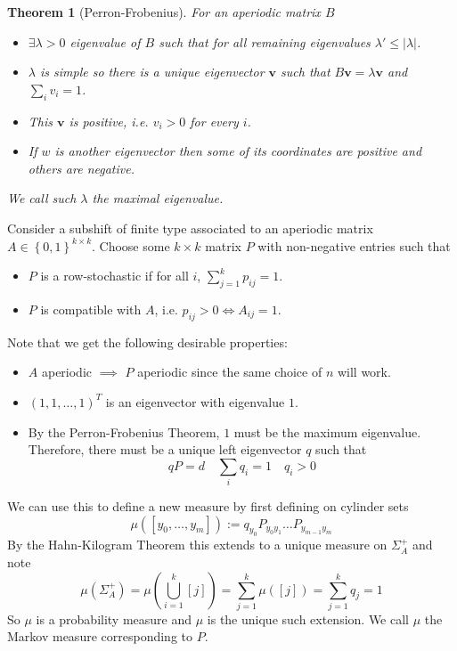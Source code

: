 \documentclass[11pt]{article}
\newcommand{\defeq}{:=}
\newcommand{\abs}[1]{\left|#1\right|}
\newcommand{\mv}[1]{\textbf{#1}}
\newcommand{\mdf}[1]{{\color{RoyalBlue} #1}}
\newtheorem{theorem}[prop]{Theorem}
\begin{document}
\begin{theorem}[Perron-Frobenius]
For an aperiodic matrix $B$
\begin{itemize}
	\item $\exists \lambda > 0$ eigenvalue of $B$ such that for all remaining eigenvalues $\lambda' \leq \abs{\lambda}$.
	\item $\lambda$ is simple so there is a unique eigenvector $\mv{v}$ such that $B\mv{v} = \lambda\mv{v}$ and $\sum_{i}v_i=1$.
	\item This $\mv{v}$ is positive, i.e. $v_i > 0$ for every $i$.
	\item If $w$ is another eigenvector then some of its coordinates are positive and others are negative.
\end{itemize}
We call such $\lambda$ the \mdf{maximal eigenvalue}.
\end{theorem}

Consider a subshift of finite type associated to an aperiodic matrix $A\in\left\{ 0, 1\right\}^{k\times k}$.
Choose some $k\times k$ matrix $P$ with non-negative entries such that
\begin{itemize}
	\item $P$ is a \mdf{row-stochastic} if for all $i$, $\sum_{j=1}^k p_{ij} =1$.
	\item $P$ is \mdf{compatible with $A$}, i.e. $p_{ij} >0 \iff A_{ij}=1$.
\end{itemize}

Note that we get the following desirable properties:
\begin{itemize}
	\item $A$ aperiodic $\implies$ $P$ aperiodic since the same choice of $n$ will work.
	\item $(1, 1, \dots, 1)^T$ is an eigenvector with eigenvalue $1$.
	\item By the Perron-Frobenius Theorem, $1$ must be the maximum eigenvalue.
		Therefore, there must be a unique left eigenvector $q$ such that
		\[
			qP = d \quad \sum_{i}q_i = 1\quad q_i >0
		\]
\end{itemize}
We can use this to define a new measure by first defining on cylinder sets
\[
	\mu(\left[ y_0, \dots, y_m \right]) \defeq q_{y_0}P_{y_0 y_1}\dots P_{y_{m-1}y_m}
\]
By the Hahn-Kilogram Theorem this extends to a unique measure on $\Sigma_A^+$ and note
\[
	\mu(\Sigma_A^+)=\mu\left( \bigcup_{i=1}^k [j] \right)=\sum_{j=1}^k \mu( \left[ j\right]) = \sum_{j=1}^k q_j =1
\]
So $\mu$ is a probability measure and $\mu$ is the unique such extension.
We call $\mu$ the \mdf{Markov measure corresponding to $P$}.
\end{document}
